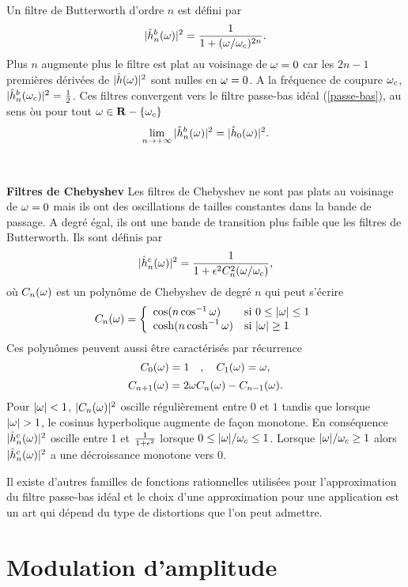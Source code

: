 Un filtre de Butterworth d'ordre $n$ est d\'efini par
\begin{equation}
\label{butterworth}
|\hat h_n^b({\omega})|^2 = \frac 1 {1 + ({\omega} / {\omega}_c)^{2n}} .
\end{equation}
Plus $n$ augmente plus le 
filtre est plat au voisinage de 
${\omega} = 0$ car
les $2n-1$ premi\`eres d\'eriv\'ees de $|\hat h({\omega})|^2$ sont nulles
en ${\omega} = 0$. A la fr\'equence de coupure ${\omega}_c$, 
$|\hat h^b_n({\omega}_c)|^2 = {\frac 1 2}$.
Ces filtres convergent vers le filtre passe-bas id\'eal
(\ref{passe-bas}), au sens \`ou
pour tout ${\omega} \in {\bf{R}} -\{ {\omega}_c\}$
\[
\lim_{n \rightarrow + \infty} |\hat h_n^b ({\omega})|^2 = 
|\hat h_0 ({\omega})|^2 .
\]
\\
\\
{\bf Filtres de Chebyshev}
Les filtres de Chebyshev ne sont pas plats au
voisinage de ${\omega} = 0$ mais ils ont des oscillations de
tailles constantes dans la bande de passage. A
degr\'e \'egal, ils ont
une bande de transition plus faible que les filtres
de Butterworth. Ils sont d\'efinis par
\[
|\hat h_n^c ({\omega})|^2 = \frac 1 {1 + {\epsilon}^2 C_n^2 ({\omega} / {\omega}_c)} ,
\]
o\`u $C_n ({\omega})$ est un polyn\^ome de Chebyshev de degr\'e $n$
qui peut s'\'ecrire
\begin{equation}
C_n({\omega}) = 
   \left\{ \begin{array}{ll} 
\cos (n \cos^{-1} {\omega} )  & \mbox{si $0 \leq |{\omega}| \leq 1$}\\
\cosh (n \cosh^{-1} {\omega} ) &\mbox{si $|{\omega}| \geq 1$}
\end{array}
   \right.  
\end{equation}
Ces polyn\^omes peuvent aussi \^etre caract\'eris\'es par r\'ecurrence
\[
C_0 ({\omega}) = 1 ~~~,~~~C_1 ({\omega}) = {\omega} ,
\]
\[
C_{n+1} ({\omega}) = 2 {\omega} C_n ({\omega}) - C_{n-1} ({\omega}) .
\]
Pour $|{\omega}| < 1$,
$|C_n({\omega})|^2$ oscille r\'eguli\`erement
entre $0$ et $1$ tandis que lorsque
$|{\omega}| > 1$, le
cosinus hyperbolique augmente
de fa\c{c}on monotone.
En cons\'equence $|\hat h_n^c ({\omega})|^2$ 
oscille entre 1 et
$\frac 1 {1 + {\epsilon}^2}$ lorsque $0 \leq |{\omega}| /{\omega}_c \leq 1$.
Lorsque $|{\omega}| /{\omega}_c \geq 1$ alors 
$|\hat h_n^c ({\omega})|^2$ a une d\'ecroissance
monotone vers $0$.

Il existe d'autres familles de fonctions rationnelles utilis\'ees
pour l'approximation du filtre passe-bas id\'eal et le choix
d'une approximation pour une application est un art
qui d\'epend du type de distortions que l'on peut admettre.


\section{Modulation d'amplitude}
\label{modulation}

